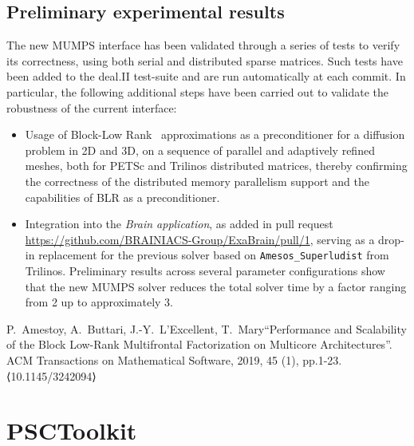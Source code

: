 \documentclass[a4paper,12pt]{article}
\begin{document}
\subsection{Preliminary experimental results}
The new MUMPS interface has been validated through a series of tests
to verify its correctness, using both serial and distributed sparse matrices. Such tests
have been added to the deal.II test-suite and are run automatically at
each commit. In particular, the following additional steps have
been carried out to validate the robustness of the current interface:
\begin{itemize}
    \item Usage of Block-Low Rank~\cite{blr} approximations as a preconditioner
          for a diffusion problem in 2D and 3D, on a sequence of parallel and
          adaptively refined meshes, both for PETSc and Trilinos distributed matrices, thereby
          confirming the correctness of the distributed memory parallelism
          support and the capabilities of BLR as a preconditioner.
    \item Integration into the \emph{Brain application}, as added
          in pull request \url{https://github.com/BRAINIACS-Group/ExaBrain/pull/1}, serving as a
          drop-in replacement for the previous solver based on \texttt{Amesos\_Superludist}
          from Trilinos. Preliminary results across several
          parameter configurations show that the new MUMPS solver
          reduces the total solver time by a factor
          ranging from 2 up to approximately 3.

\end{itemize}



\begin{thebibliography}{10}
     P.~Amestoy, A.~Buttari, J.-Y.~L'Excellent,
    T.~Mary``Performance and Scalability of the Block Low-Rank
    Multifrontal Factorization on Multicore Architectures''. ACM
    Transactions on Mathematical Software, 2019, 45 (1),
    pp.1-23. ⟨10.1145/3242094⟩
\end{thebibliography}



\newpage

\section{PSCToolkit}
\label{sec:section3}
\end{document}

